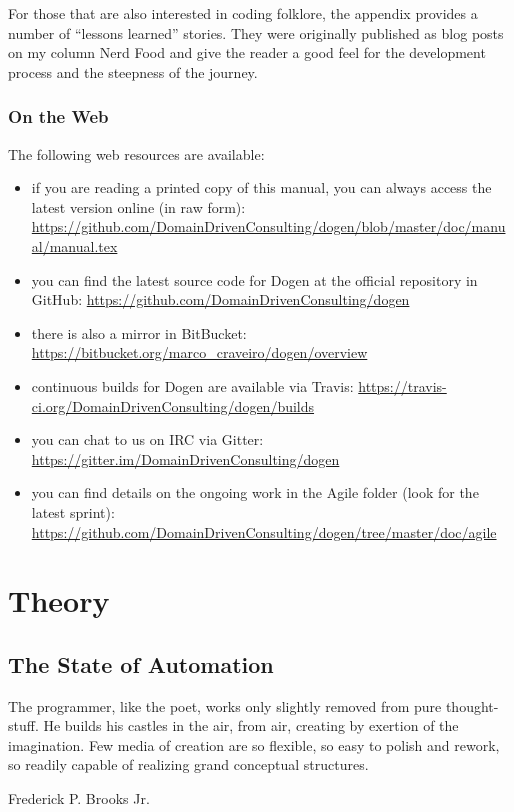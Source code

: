 \documentclass{book}
\begin{document}
For those that are also interested in coding folklore, the appendix
provides a number of ``lessons learned'' stories. They were originally
published as blog posts on my column Nerd Food and give the reader a
good feel for the development process and the steepness of the
journey.

\section*{On the Web}

The following web resources are available:

\begin{itemize}
\item if you are reading a printed copy of this manual, you can always
  access the latest version online (in raw \LaTeXe form): \url{https://github.com/DomainDrivenConsulting/dogen/blob/master/doc/manual/manual.tex}
\item you can find the latest source code for Dogen at the official
  repository in GitHub:
  \url{https://github.com/DomainDrivenConsulting/dogen}
\item there is also a mirror in BitBucket:
  \url{https://bitbucket.org/marco_craveiro/dogen/overview}
\item continuous builds for Dogen are available via Travis:
  \url{https://travis-ci.org/DomainDrivenConsulting/dogen/builds}
\item you can chat to us on IRC via Gitter:
  \url{https://gitter.im/DomainDrivenConsulting/dogen}
\item you can find details on the ongoing work in the Agile folder
  (look for the latest sprint):
  \url{https://github.com/DomainDrivenConsulting/dogen/tree/master/doc/agile}
\end{itemize}

\part{Theory}
\label{theory}

\chapter{The State of Automation}

\epigraph{The programmer, like the poet, works only slightly removed
  from pure thought-stuff. He builds his castles in the air, from air,
  creating by exertion of the imagination. Few media of creation are
  so flexible, so easy to polish and rework, so readily capable of
  realizing grand conceptual structures.}{Frederick P. Brooks
  Jr.\cite{Brooks:1995:MM:207583}}
\end{document}
